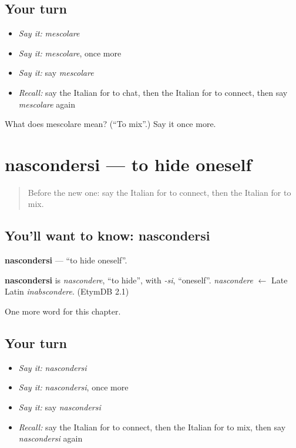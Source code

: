 \subsection*{Your turn}
\begin{itemize}
\raggedright
  \item \emph{Say it:} \emph{mescolare}
  \item \emph{Say it:} \emph{mescolare}, once more
  \item \emph{Say it:} say \emph{mescolare}
  \item \emph{Recall:} say the Italian for to chat, then the Italian for to connect, then say \emph{mescolare} again
\end{itemize}

\begin{tcolorbox}[breakable,colback=teal!4,colframe=teal!35!black,title={Before you move on}]
What does mescolare mean? (\textquotedblleft{}To mix\textquotedblright{}.) Say it once more.
\end{tcolorbox}
\section[nascondersi]{nascondersi — to hide oneself}

\label{lesson:IT-C213-nascondersi}



\begin{quote}
Before the new one: say the Italian for to connect, then the Italian for to mix.
\end{quote}

\subsection*{You'll want to know: nascondersi}
\textbf{nascondersi} — \textquotedblleft{}to hide oneself\textquotedblright{}.

\begin{cousinweb}
\textbf{nascondersi} is \emph{nascondere}, \textquotedblleft{}to hide\textquotedblright{}, with \emph{-si}, \textquotedblleft{}oneself\textquotedblright{}. \emph{nascondere} $\leftarrow$ Late Latin \emph{inabscondere}. (EtymDB 2.1)
\end{cousinweb}

\begin{grammarlens}[title={What you've built}]
One more word for this chapter.
\end{grammarlens}

\subsection*{Your turn}
\begin{itemize}
\raggedright
  \item \emph{Say it:} \emph{nascondersi}
  \item \emph{Say it:} \emph{nascondersi}, once more
  \item \emph{Say it:} say \emph{nascondersi}
  \item \emph{Recall:} say the Italian for to connect, then the Italian for to mix, then say \emph{nascondersi} again
\end{itemize}

